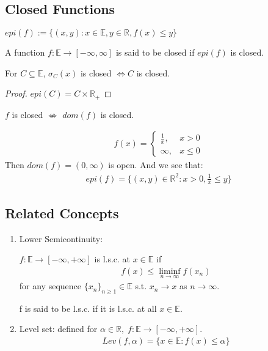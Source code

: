 \documentclass[11pt]{article}
\begin{document}
\subsection{Closed Functions}
\begin{definition}
    $epi(f) := \{ (x,y): x \in \mathbb{E}, y \in \mathbb{R}, f(x) \le y \}$
\end{definition}

\begin{definition}
    A function $f: \mathbb{E} \to [-\infty,\infty]$ is said to be closed if $epi(f)$ is closed.
\end{definition}

\begin{proposition}
    For $C \subseteq \mathbb{E}$, $\sigma_{C}(x)$ is closed $\iff C$ is closed.
\end{proposition}
\begin{proof}
    $epi(C) = C \times \mathbb{R}_{+}$
\end{proof}

\begin{remark}
    $f$ is closed $\not\iff$ $dom(f)$ is closed.
\end{remark}

\begin{example}
    \begin{align*}
        f(x) = \begin{cases} 
        \frac{1}{x}, &x > 0  \\ 
        \infty, & x \le 0   
        \end{cases}
    \end{align*}
    Then $dom(f) = (0,\infty)$ is open. And we see that:
    \begin{align*}
        epi(f) = \{ (x,y) \in \mathbb{R}^{2}: x>0, \frac{1}{x} \le y \}
    \end{align*}
\end{example}

\subsection{Related Concepts}
\begin{enumerate}
    \item Lower Semicontinuity:
    \begin{definition}
        $f:\mathbb{E} \to [-\infty,+\infty]$ is l.s.c. at $x \in \mathbb{E}$ if 
        \begin{align*}
            f(x) \le \liminf_{n \to \infty} f(x_n) 
        \end{align*}
        for any sequence $\{ x_n  \}_{n\ge 1} \in \mathbb{E}$ s.t.
        $x_n \to x $ as $n \to \infty$.

        f is said to be l.s.c. if it is l.s.c. at all $x \in \mathbb{E}$.
    \end{definition}
    \item Level set: 
    defined for $\alpha \in \mathbb{R}, \; f:\mathbb{E} \to [-\infty,+\infty]$.
    \begin{align*}
        Lev(f,\alpha) = \{ x \in \mathbb{E}:f(x) \le \alpha \}
    \end{align*}
\end{enumerate}
\end{document}
